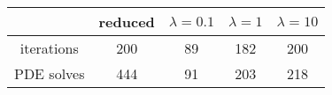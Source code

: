 \begin{tabular}{ccccc}
& reduced & $\lambda = 0.1$ & $\lambda = 1$ & $\lambda = 10$ \\
\hline
iterations & 200 & 89 & 182 & 200 \\
PDE solves & 444 & 91 & 203 & 218 \\
\hline
\end{tabular}
